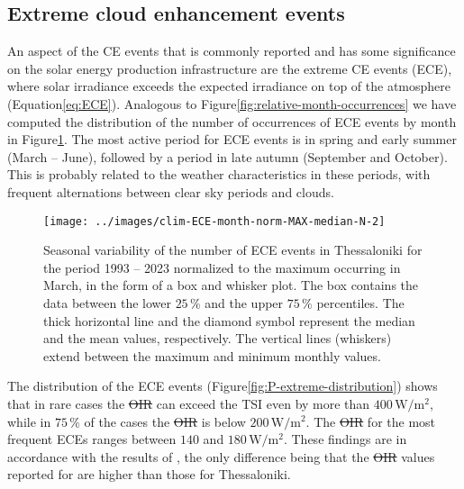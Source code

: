 \documentclass[preprint, 5p,
authoryear]{elsarticle} %
\providecommand{\DIFaddtex}[1]{{\protect\color{blue}\uwave{#1}}} %
\providecommand{\DIFdeltex}[1]{{\protect\color{red}\sout{#1}}}                      %
\providecommand{\DIFaddbegin}{} %
\providecommand{\DIFaddend}{} %
\providecommand{\DIFdelbegin}{} %
\providecommand{\DIFdelend}{} %
\providecommand{\DIFadd}[1]{\texorpdfstring{\DIFaddtex{#1}}{#1}} %
\providecommand{\DIFdel}[1]{\texorpdfstring{\DIFdeltex{#1}}{}} %
\newcommand{\DIFscaledelfig}{0.5}
\newlength{\DIFdelgraphicswidth} %
\newlength{\DIFdelgraphicsheight} %
\newcommand{\DIFaddincludegraphics}[2][]{{\color{blue}\fbox{\DIFOincludegraphics[#1]{#2}}}} %
\newcommand{\DIFdelincludegraphics}[2][]{%
\sbox{\DIFdelgraphicsbox}{\DIFOincludegraphics[#1]{#2}}%
\settoboxwidth{\DIFdelgraphicswidth}{\DIFdelgraphicsbox} %
\settoboxtotalheight{\DIFdelgraphicsheight}{\DIFdelgraphicsbox} %
\scalebox{\DIFscaledelfig}{%
\parbox[b]{\DIFdelgraphicswidth}{\usebox{\DIFdelgraphicsbox}\\[-\baselineskip] \rule{\DIFdelgraphicswidth}{0em}}\llap{\resizebox{\DIFdelgraphicswidth}{\DIFdelgraphicsheight}{%
\setlength{\unitlength}{\DIFdelgraphicswidth}%
\begin{picture}(1,1)%
\thicklines\linethickness{2pt} %
{\color[rgb]{1,0,0}\put(0,0){\framebox(1,1){}}}%
{\color[rgb]{1,0,0}\put(0,0){\line( 1,1){1}}}%
{\color[rgb]{1,0,0}\put(0,1){\line(1,-1){1}}}%
\end{picture}%
}\hspace*{3pt}}} %
} %
\DeclareRobustCommand{\DIFaddbegin}{\DIFOaddbegin \let\includegraphics\DIFaddincludegraphics} %
\DeclareRobustCommand{\DIFaddend}{\DIFOaddend \let\includegraphics\DIFOincludegraphics} %
\DeclareRobustCommand{\DIFdelbegin}{\DIFOdelbegin \let\includegraphics\DIFdelincludegraphics} %
\DeclareRobustCommand{\DIFdelend}{\DIFOaddend \let\includegraphics\DIFOincludegraphics} %
\begin{document}
\hypertarget{extreme-cloud-enhancement-events}{%
\subsection{Extreme cloud enhancement
events}\label{extreme-cloud-enhancement-events}}

An aspect of the CE events that is commonly reported and has some
significance on the solar energy production infrastructure are the
extreme CE events (ECE), where solar irradiance exceeds the expected
irradiance on top of the atmosphere \DIFaddbegin \DIFadd{at the same SZA
}\DIFaddend (Equation\nobreakspace{}\ref{eq:ECE}). Analogous to
Figure\nobreakspace{}\ref{fig:relative-month-occurrences} we have
computed the distribution of the number of occurrences of ECE events by
month in Figure\nobreakspace{}\ref{fig:relative-month-occurancies-ECE}.
The most active period for ECE events is in spring and early summer
(March -- June), followed by a period in late autumn (September and
October). This is probably related to the weather characteristics in
these periods, with frequent alternations between clear sky periods and
clouds.

\begin{figure}

{\centering \texttt{[image: ../images/clim-ECE-month-norm-MAX-median-N-2]} 

}

\caption{Seasonal variability of the number of ECE events in Thessaloniki for the period 1993 -- 2023 normalized to the maximum occurring in March, in the form of a box and whisker plot. The box contains the data between the lower $25\,\%$ and the upper $75\,\%$ percentiles. The thick horizontal line and the diamond symbol represent the median and the mean values, respectively. The vertical lines (whiskers) extend between the maximum and minimum monthly values.}\label{fig:relative-month-occurancies-ECE}
\end{figure}

The distribution of the ECE events
(Figure\nobreakspace{}\ref{fig:P-extreme-distribution}) shows that in
rare cases the \DIFdelbegin \DIFdel{OIR }\DIFdelend \DIFaddbegin \DIFadd{OI }\DIFaddend can exceed the TSI even by more than
\(400\,\text{W}/\text{m}^2\), while in \(75\,\%\) of the cases the \DIFdelbegin \DIFdel{OIR
}\DIFdelend \DIFaddbegin \DIFadd{OI }\DIFaddend is
below \(200\,\text{W}/\text{m}^2\). The \DIFdelbegin \DIFdel{OIR }\DIFdelend \DIFaddbegin \DIFadd{OI }\DIFaddend for the most frequent ECEs
ranges between \(140\) and \(180\,\text{W}/\text{m}^2\). These findings
are in accordance with the results of \citet{Vamvakas2020}, the only
difference being that the \DIFdelbegin \DIFdel{OIR }\DIFdelend \DIFaddbegin \DIFadd{OI }\DIFaddend values reported for are higher than those
for Thessaloniki.
\end{document}
